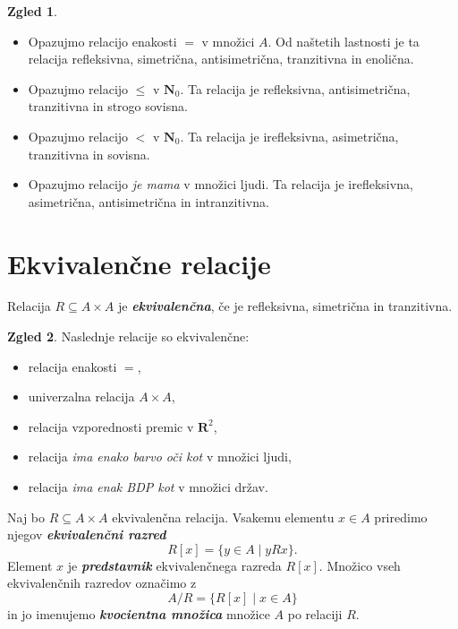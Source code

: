 \documentclass[11pt]{book}
\def\NN{\mathbf{N}}
\def\RR{\mathbf{R}}
\def\definicija{\color{rdeca}\bf\em}
\theoremstyle{definition}
\theoremstyle{zgled}
\newtheorem*{zgled}{Zgled}
\theoremstyle{odprtproblem}
\theoremstyle{domacanaloga}
\theoremstyle{izrek}
\begin{document}
\begin{zgled} \leavevmode
    \begin{itemize}
        \item Opazujmo relacijo enakosti $=$ v množici $A$. Od naštetih lastnosti je ta relacija refleksivna, simetrična, antisimetrična, tranzitivna in enolična.
        \item Opazujmo relacijo $\leq$ v $\NN_0$. Ta relacija je refleksivna, antisimetrična, tranzitivna in strogo sovisna.
        \item Opazujmo relacijo $<$ v $\NN_0$. Ta relacija je irefleksivna, asimetrična, tranzitivna in sovisna.
        \item Opazujmo relacijo \emph{je mama} v množici ljudi. Ta relacija je irefleksivna, asimetrična, antisimetrična in intranzitivna.
    \end{itemize}
\end{zgled}

\section{Ekvivalenčne relacije}

Relacija $R \subseteq A \times A$ je {\definicija ekvivalenčna}, če je refleksivna, simetrična in tranzitivna.

\begin{zgled}
Naslednje relacije so ekvivalenčne:
\begin{itemize}
    \item relacija enakosti $=$,
    \item univerzalna relacija $A \times A$,
    \item relacija vzporednosti premic v $\RR^2$,
    \item relacija \emph{ima enako barvo oči kot} v množici ljudi,
    \item relacija \emph{ima enak BDP kot} v množici držav.
\end{itemize}
\end{zgled}

Naj bo $R \subseteq A \times A$ ekvivalenčna relacija. Vsakemu elementu $x \in A$ priredimo njegov {\definicija ekvivalenčni razred} 
\[
    R[x] = \{ y \in A \mid yRx \}.
\]
Element $x$ je {\definicija predstavnik} ekvivalenčnega razreda $R[x]$. Množico vseh ekvivalenčnih razredov označimo z
\[
    A/R = \{ R[x] \mid x \in A \}
\]
in jo imenujemo {\definicija kvocientna množica} množice $A$ po relaciji $R$.
\end{document}

